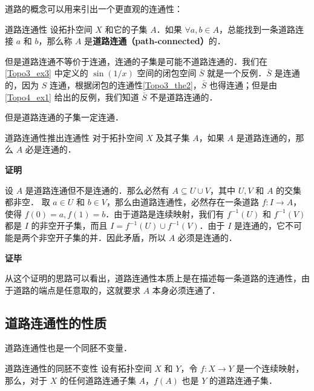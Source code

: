 道路的概念可以用来引出一个更直观的连通性：

\begin{definition}{道路连通性}\label{Topo4_def2}
设拓扑空间 $X$ 和它的子集 $A$．如果 $\forall a, b\in A$，总能找到一条道路连接 $a$ 和 $b$，那么称 $A$ 是\textbf{道路连通（path-connected）}的．
\end{definition}

但是道路连通不等价于连通，连通的子集是可能不道路连通的．我们在\autoref{Topo3_ex3} 中定义的 $\sin(1/x)$ 空间的闭包空间 $\bar{S}$ 就是一个反例．$\bar{S}$ 是连通的，因为 $S$ 连通，根据闭包的连通性\autoref{Topo3_the2}，$\bar{S}$ 也得连通；但是由\autoref{Topo4_ex1} 给出的反例，我们知道 $\bar{S}$ 不是道路连通的．

但是道路连通的子集一定连通．

\begin{theorem}{道路连通性推出连通性}\label{Topo4_the1}
对于拓扑空间 $X$ 及其子集 $A$，如果 $A$ 是道路连通的，那么 $A$ 必是连通的．
\end{theorem}

\textbf{证明}

设 $A$ 是道路连通但不是连通的．那么必然有 $A\subseteq U\cup V$，其中 $U, V$ 和 $A$ 的交集都非空．
取 $a\in U$ 和 $b\in V$，那么由道路连通性，必然存在一条道路 $f:I\rightarrow A$，使得 $f(0)=a, f(1)=b$．由于道路是连续映射，我们有 $f^{-1}(U)$ 和 $f^{-1}(V)$ 都是 $I$ 的非空开子集，而且 $I=f^{-1}(U)\cup f^{-1}(V)$．由于 $I$ 是连通的，它不可能是两个非空开子集的并．因此矛盾，所以 $A$ 必须是连通的．

\textbf{证毕}

从这个证明的思路可以看出，道路连通性本质上是在描述每一条道路的连通性，由于道路的端点是任意取的，这就要求 $A$ 本身必须连通了．

\subsection{道路连通性的性质}

道路连通性也是一个同胚不变量．

\begin{theorem}{道路连通性的同胚不变性}
设有拓扑空间 $X$ 和 $Y$，令 $f:X\rightarrow Y$ 是一个连续映射，那么，对于 $X$ 的任何道路连通子集 $A$，$f(A)$ 也是 $Y$ 的道路连通子集．
\end{theorem}